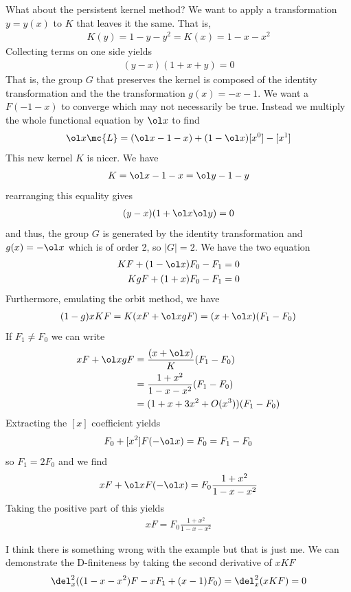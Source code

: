 \begin{example}
What about the persistent kernel method? We want to apply a transformation $y = y(x)$ to $K$ that leaves it the same. That is,
\begin{align}
	K(y) = 1 - y - y^2 = K(x) = 1 - x - x^2
\end{align}
Collecting terms on one side yields
\begin{align}
	(y-x)(1+x+y) = 0
\end{align}
That is, the group $G$ that preserves the kernel is composed of the identity transformation and the the transformation $g(x) = -x-1$. We want a $F(-1-x)$ to converge which may not necessarily be true. Instead we multiply the whole functional equation by $\ol x$ to find
\begin{align}
\ol x \mc{L} = (\ol x-1-x) + (1-\ol x)[x^0]-[x^1]
\end{align}
This new kernel $K$ is nicer. We have
\begin{align}
	K = \ol x-1-x = \ol y-1-y
\end{align}
rearranging this equality gives
\begin{align}
	(y-x)(1+\ol x\ol y) = 0
\end{align}
and thus, the group $G$ is generated by the identity transformation and $g(x) = -\ol x$ which is of order 2, so $|G| = 2$. We have the two equation
\begin{align}
KF +(1-\ol x)F_0 - F_1 &= 0\\
KgF + (1+x)F_0  - F_1 &=0
\end{align}
Furthermore, emulating the orbit method, we have
\begin{align}
	(1-g)xKF = K(xF+\ol xgF)  = (x+\ol x)(F_1-F_0)
\end{align}
If $F_1 \neq F_0$ we can write
\begin{align}
	xF+\ol xgF &= \frac{(x+\ol x)}{K}(F_1-F_0) \\
	&= \frac{1+x^2}{1-x-x^2}(F_1-F_0) \\
	&= (1+x+3x^2+O(x^3))(F_1-F_0)
\end{align}
Extracting the $[x]$ coefficient yields
\begin{align}
	F_0 +[x^2]F(-\ol x) = F_0 = F_1 - F_0
\end{align}
so $F_1= 2 F_0$ and we find
\begin{align}
	xF+\ol xF(-\ol x) = F_0 \frac{1+x^2}{1-x-x^2}
\end{align}
Taking the positive part of this yields
\begin{align}
	xF= F_0 \frac{1+x^2}{1-x-x^2}
\end{align}
\end{example}
I think there is something wrong with the example but that is just me. We can demonstrate the D-finiteness by taking the second derivative of $xKF$
\begin{align}
	\del_x^2((1-x - x^2) F - x F_1 + (x-1) F_0) = \del_x^2(xKF) = 0
\end{align}

